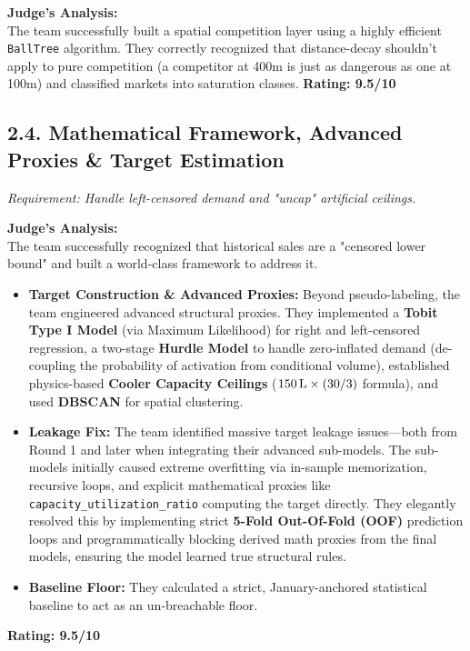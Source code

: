 \documentclass[11pt, a4paper]{article}
\begin{document}
\textbf{\textcolor{judgereview}{Judge's Analysis:}} \\
The team successfully built a spatial competition layer using a highly efficient \texttt{BallTree} algorithm. They correctly recognized that distance-decay shouldn't apply to pure competition (a competitor at 400m is just as dangerous as one at 100m) and classified markets into saturation classes.
\textbf{Rating: 9.5/10}

\subsection*{2.4. Mathematical Framework, Advanced Proxies \& Target Estimation}
\textit{Requirement: Handle left-censored demand and "uncap" artificial ceilings.}

\textbf{\textcolor{judgereview}{Judge's Analysis:}} \\
The team successfully recognized that historical sales are a "censored lower bound" and built a world-class framework to address it.
\begin{itemize}[leftmargin=*]
    \item \textbf{Target Construction \& Advanced Proxies:} Beyond pseudo-labeling, the team engineered advanced structural proxies. They implemented a \textbf{Tobit Type I Model} (via Maximum Likelihood) for right and left-censored regression, a two-stage \textbf{Hurdle Model} to handle zero-inflated demand (de-coupling the probability of activation from conditional volume), established physics-based \textbf{Cooler Capacity Ceilings} ($150\text{\,L} \times (30/3)$ formula), and used \textbf{DBSCAN} for spatial clustering.
    \item \textbf{Leakage Fix:} The team identified massive target leakage issues---both from Round 1 and later when integrating their advanced sub-models. The sub-models initially caused extreme overfitting via in-sample memorization, recursive loops, and explicit mathematical proxies like \texttt{capacity\_utilization\_ratio} computing the target directly. They elegantly resolved this by implementing strict \textbf{5-Fold Out-Of-Fold (OOF)} prediction loops and programmatically blocking derived math proxies from the final models, ensuring the model learned true structural rules.
    \item \textbf{Baseline Floor:} They calculated a strict, January-anchored statistical baseline to act as an un-breachable floor.
\end{itemize}
\textbf{Rating: 9.5/10}
\end{document}
